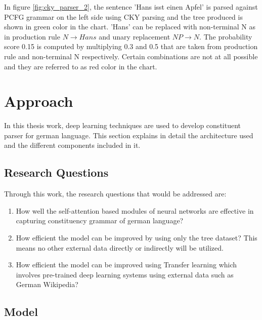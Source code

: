 \documentclass[a4paper, 11pt]{article}
\begin{document}
In figure \ref{fig:cky_parser_2}, the sentence 'Hans isst einen Apfel' is parsed against PCFG grammar on the left side using CKY parsing and the tree produced is shown in green color in the chart. 'Hans' can be replaced with non-terminal N as in production rule $N \rightarrow Hans$ and unary replacement     $NP \rightarrow N$. The probability score 0.15 is computed by multiplying 0.3 and 0.5 that are taken from production rule and non-terminal N respectively. Certain combinations are not at all possible and they are referred to as red color in the chart. 


\pagebreak
\section{Approach}  

In this thesis work, deep learning techniques are used to develop constituent parser for german language. This section explains in detail the architecture used and the different components included in it. 

\subsection{Research Questions}

Through this work, the research questions that would be addressed are:
\begin{enumerate}
\item How well the self-attention based modules of neural networks are effective in capturing constituency grammar of german language? 
\item How efficient the model can be improved by using only the tree dataset? This means no other external data directly or indirectly will be utilized. 
\item How efficient the model can be improved using Transfer learning which involves pre-trained deep learning systems using external data such as German Wikipedia?
\end{enumerate}

\subsection{Model}
\end{document}
